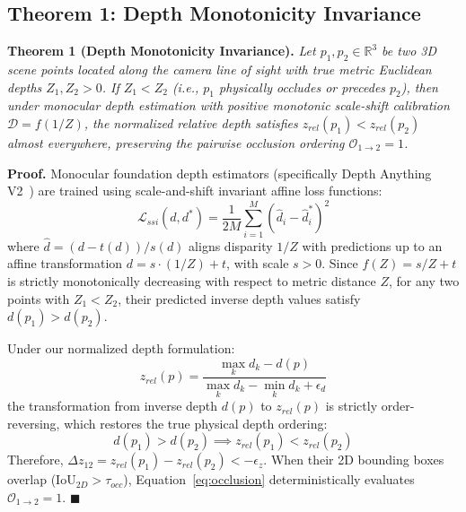 \documentclass[10pt,twocolumn,letterpaper]{article}
\begin{document}
\subsection{Theorem 1: Depth Monotonicity Invariance}
\textbf{Theorem 1 (Depth Monotonicity Invariance).} \textit{Let $p_1, p_2 \in \mathbb{R}^3$ be two 3D scene points located along the camera line of sight with true metric Euclidean depths $Z_1, Z_2 > 0$. If $Z_1 < Z_2$ (i.e., $p_1$ physically occludes or precedes $p_2$), then under monocular depth estimation with positive monotonic scale-shift calibration $\mathcal{D} = f(1/Z)$, the normalized relative depth satisfies $z_{rel}(p_1) < z_{rel}(p_2)$ almost everywhere, preserving the pairwise occlusion ordering $\mathcal{O}_{1 \to 2} = 1$.}

\textbf{Proof.} Monocular foundation depth estimators (specifically Depth Anything V2~\cite{yang2024depthanything}) are trained using scale-and-shift invariant affine loss functions:
\begin{equation}
\mathcal{L}_{ssi}(d, d^*) = \frac{1}{2M} \sum_{i=1}^M \left( \hat{d}_i - \hat{d}_i^* \right)^2
\end{equation}
where $\hat{d} = (d - t(d)) / s(d)$ aligns disparity $1/Z$ with predictions up to an affine transformation $d = s \cdot (1/Z) + t$, with scale $s > 0$. Since $f(Z) = s/Z + t$ is strictly monotonically decreasing with respect to metric distance $Z$, for any two points with $Z_1 < Z_2$, their predicted inverse depth values satisfy $d(p_1) > d(p_2)$. 

Under our normalized depth formulation:
\begin{equation}
z_{rel}(p) = \frac{\max_k d_k - d(p)}{\max_k d_k - \min_k d_k + \epsilon_d}
\end{equation}
the transformation from inverse depth $d(p)$ to $z_{rel}(p)$ is strictly order-reversing, which restores the true physical depth ordering:
\begin{equation}
d(p_1) > d(p_2) \implies z_{rel}(p_1) < z_{rel}(p_2)
\end{equation}
Therefore, $\Delta z_{12} = z_{rel}(p_1) - z_{rel}(p_2) < -\epsilon_z$. When their 2D bounding boxes overlap ($\mathrm{IoU}_{2D} > \tau_{occ}$), Equation~\eqref{eq:occlusion} deterministically evaluates $\mathcal{O}_{1 \to 2} = 1$. $\blacksquare$
\end{document}
